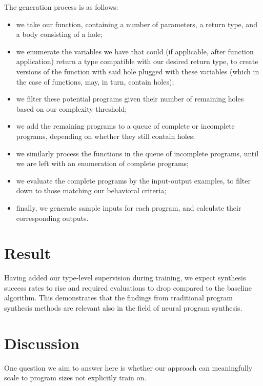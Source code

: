\documentclass{article}
\begin{document}
The generation process is as follows:
\begin{itemize}
    \item we take our function, containing a number of parameters, a return type, and a body consisting of a hole;
    \item we enumerate the variables we have that could (if applicable, after function application) return a type compatible with our desired return type, to create versions of the function with said hole plugged with these variables (which in the case of functions, may, in turn, contain holes);
    \item we filter these potential programs given their number of remaining holes based on our complexity threshold;
    \item we add the remaining programs to a queue of complete or incomplete programs, depending on whether they still contain holes;
    \item we similarly process the functions in the queue of incomplete programs, until we are left with an enumeration of complete programs;
    \item we evaluate the complete programs by the input-output examples, to filter down to those matching our behavioral criteria;
    \item finally, we generate sample inputs for each program, and calculate their corresponding outputs.
\end{itemize}


\section{Result}

Having added our type-level supervision during training, we expect synthesis success rates to rise and required evaluations to drop compared to the baseline algorithm.
This demonstrates that the findings from traditional program synthesis methods are relevant also in the field of neural program synthesis.


\section{Discussion}

One question we aim to answer here is whether our approach can meaningfully scale to program sizes not explicitly train on.

\nocite{*}


\end{document}
